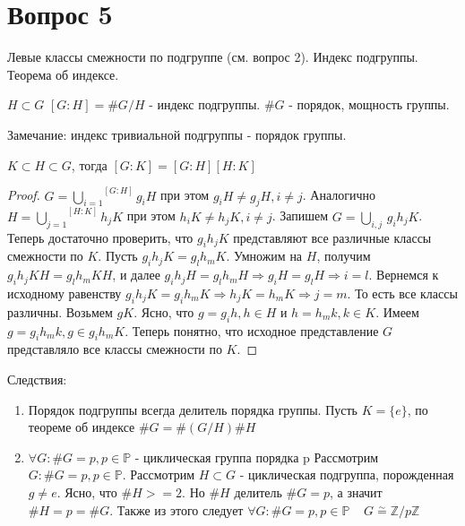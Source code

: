 \section{Вопрос 5}

Левые классы смежности по подгруппе (см. вопрос 2). Индекс подгруппы. Теорема об индексе.

\begin{defn}
  $ H \subset G $ \newline
  $ [G:H] = \#G/H $ - индекс подгруппы. \newline
  $ \#G $ - порядок, мощность группы. 
\end{defn}

Замечание: индекс тривиальной подгруппы - порядок группы.

\begin{thm}
  $ K \subset H \subset G $, \newline тогда $ [G:K] = [G:H][H:K] $
\end{thm}
\begin{proof}
  $ G = \overset{[G:H]}{\underset{i=1}{\bigcup}} g_{i}H $ при этом $ g_{i}H \ne g_{j}H, i \ne j $. 
  Аналогично $ H = \overset{[H:K]}{\underset{j=1}\bigcup} h_{j}K $ при этом $ h_{i}K \ne h_{j}K, i \ne j $. 
  Запишем $ G = \underset{i, j}\bigcup \, g_{i}h_{j}K $. \newline
  Теперь достаточно проверить, что $ g_{i}h_{j}K $ представляют все различные классы смежности по $ K $.
  Пусть $ g_{i}h_{j}K = g_{l}h_{m}K $. Умножим на $ H $, получим $ g_{i}h_{j}KH = g_{l}h_{m}KH $, и далее
  $ g_{i}h_{j}H = g_{l}h_{m}H \Rightarrow  g_{i}H = g_{l}H \Rightarrow i = l $. Вернемся к исходному равенству
  $ g_{i}h_{j}K = g_{i}h_{m}K \Rightarrow h_{j}K = h_{m}K \Rightarrow j = m $. То есть все классы различны. \newline
  Возьмем $ gK $. Ясно, что $ g = g_{i}h, h \in H $ и $ h = h_{m}k, k \in K $. Имеем 
  $ g = g_{i}h_{m}k, g \in g_{i}h_{m}K $. Теперь понятно, что исходное представление $ G $ представляло все классы
  смежности по $ K $.
\end{proof}

Следствия:

\begin{enumerate}
  \item Порядок подгруппы всегда делитель порядка группы. \newline
    Пусть $ K = \{e\} $, по теореме об индексе $ \#G = \#(G/H)\#H $
  \item $ \forall G : \#G = p, p \in \mathbb{P} $ - циклическая группа порядка p \newline
    Рассмотрим $ G : \#G = p, p \in \mathbb{P} $. Рассмотрим $ H \subset G $ - циклическая подгруппа,
    порожденная $ g \ne e $. Ясно, что $ \#H >= 2 $. Но $ \#H $ делитель $ \#G = p $, а значит
    $ \#H = p = \# G $. Также из этого следует $ \forall G : \#G = p, p \in \mathbb{P} \;\;\;\; 
    G \overset\sim{=} \mathbb{Z}/p\mathbb{Z} $
\end{enumerate}
